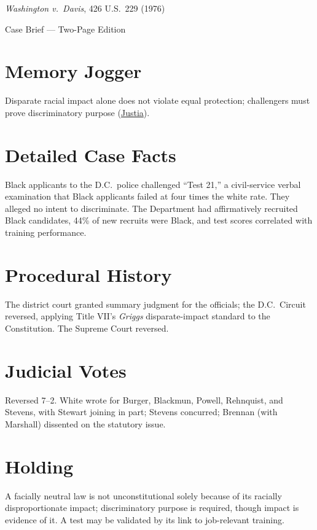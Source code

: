 \documentclass[12pt]{article}
\begin{document}
\begin{center}
{\LARGE \textit{Washington v.\ Davis}, 426 U.S.\ 229 (1976)\par}
\vspace{0.5em}
{\large Case Brief --- Two-Page Edition\par}
\end{center}

\section{Memory Jogger}
Disparate racial impact alone does not violate equal protection; challengers must prove discriminatory purpose (\href{https://supreme.justia.com/cases/federal/us/426/229/}{Justia}).

\section{Detailed Case Facts}
Black applicants to the D.C.\ police challenged ``Test 21,'' a civil-service verbal examination that Black applicants failed at four times the white rate. They alleged no intent to discriminate. The Department had affirmatively recruited Black candidates, 44\% of new recruits were Black, and test scores correlated with training performance.

\section{Procedural History}
The district court granted summary judgment for the officials; the D.C.\ Circuit reversed, applying Title VII's \textit{Griggs} disparate-impact standard to the Constitution. The Supreme Court reversed.

\section{Judicial Votes}
Reversed 7--2. White wrote for Burger, Blackmun, Powell, Rehnquist, and Stevens, with Stewart joining in part; Stevens concurred; Brennan (with Marshall) dissented on the statutory issue.

\section{Holding}
A facially neutral law is not unconstitutional solely because of its racially disproportionate impact; discriminatory purpose is required, though impact is evidence of it. A test may be validated by its link to job-relevant training.
\end{document}
